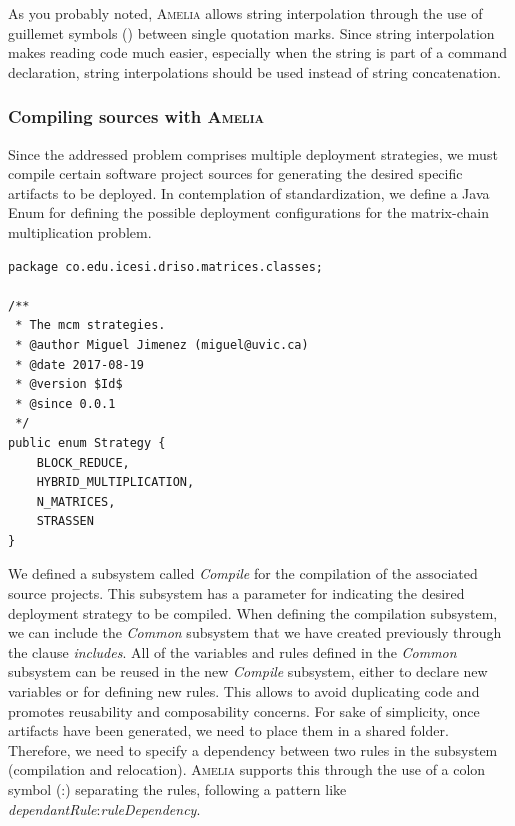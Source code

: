 \documentclass{article}
\newcommand\amelia[0]{\textsc{Amelia}}
\begin{document}
As you probably noted, \amelia{} allows string interpolation through the use of guillemet symbols (\guillemotleft\guillemotright) between single quotation marks. Since string interpolation makes reading code much easier, especially when the string is part of a command declaration, string interpolations should be used instead of string concatenation. 

\subsubsection{Compiling sources with \amelia{}}

Since the addressed problem comprises multiple deployment strategies, we must compile certain software project sources for generating the desired specific artifacts to be deployed. In contemplation of standardization, we define a Java Enum for defining the possible deployment configurations for the matrix-chain multiplication problem. \\

\begin{lstlisting}[style=amelia,caption=Java Enum for possible deployment configurations.]
package co.edu.icesi.driso.matrices.classes;

/**
 * The mcm strategies.
 * @author Miguel Jimenez (miguel@uvic.ca)
 * @date 2017-08-19
 * @version $Id$
 * @since 0.0.1
 */
public enum Strategy {
    BLOCK_REDUCE,
    HYBRID_MULTIPLICATION,
    N_MATRICES,
    STRASSEN
}

\end{lstlisting}

We defined a subsystem called \textit{Compile} for the compilation of the associated source projects. This subsystem has a parameter for indicating the desired deployment strategy to be compiled. When defining the compilation subsystem, we can include the \textit{Common} subsystem that we have created previously through the clause \textit{includes}. All of the variables and rules defined in the \textit{Common} subsystem can be reused in the new \textit{Compile} subsystem, either to declare new variables or for defining new rules. This allows to avoid duplicating code and promotes reusability and composability concerns. For sake of simplicity, once artifacts have been generated, we need to place them in a shared folder. Therefore, we need to specify a dependency between two rules in the subsystem (compilation and relocation). \amelia{} supports this through the use of a colon symbol (:) separating the rules, following a pattern like \textit{dependantRule}:\textit{ruleDependency}. \\
\end{document}
